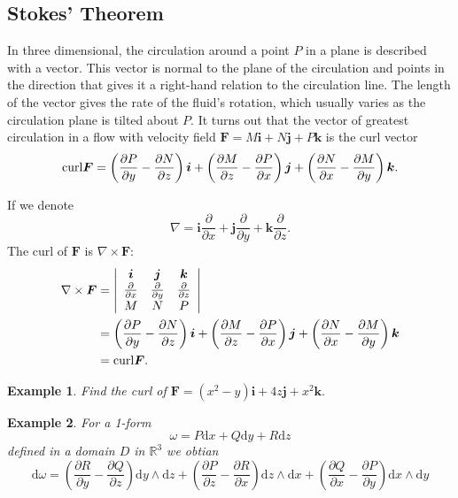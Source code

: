 \documentclass[a4paper,12pt]{article}
\newtheorem{example}{Example}             %
\begin{document}
\begin{CJK}{UTF8}{gbsn}
\section{Stokes' Theorem}
In three dimensional, the circulation around a point $P$ in a plane is 
described with a vector. This vector is normal to the plane of the 
circulation and points in the direction that gives it a right-hand 
relation to the circulation line. The length of the vector gives the
rate of the fluid's rotation, which usually varies as the circulation 
plane is tilted about $P$. It turns out that the vector of greatest circulation 
in a flow with velocity field $\bm{F} = M\bm{i} + N\bm{j} + P\bm{k}$
is the curl vector
\begin{equation}
    {\rm curl}\bm{F} = \left(\frac{\partial P}{\partial y} - \frac{\partial N}{\partial z}\right)
    \bm{i} + \left(\frac{\partial M}{\partial z} - \frac{\partial P}{\partial x}\right)\bm{j}
    + \left(\frac{\partial N}{\partial x} - \frac{\partial M}{\partial y}\right)\bm{k}.
\end{equation}

If we denote 
\begin{equation}
    \nabla = \bm{i}\frac{\partial}{\partial x} + \bm{j}\frac{\partial}{\partial y} + \bm{k}\frac{\partial}{\partial z}.
\end{equation}
The curl of $\bm{F}$ is $\nabla \times \bm{F}$:
\[
    \begin{split}
        \nabla \times \bm{F} & = \left| \begin{array}{ccc} \bm{i} & \bm{j} & \bm{k} \\
        \frac{\partial}{\partial x} & \frac{\partial}{\partial y} & \frac{\partial}{\partial z}\\
    M & N & P \end{array} \right|\\
        & = \left(\frac{\partial P}{\partial y} - \frac{\partial N}{\partial z}\right)
    \bm{i} + \left(\frac{\partial M}{\partial z} - \frac{\partial P}{\partial x}\right)\bm{j}
    + \left(\frac{\partial N}{\partial x} - \frac{\partial M}{\partial y}\right)\bm{k}\\
        & = {\rm curl }\bm{F}.
    \end{split}
\]

\begin{example}
    Find the curl of $\bm{F} = \left(x^2 - y\right)\bm{i} + 4z\bm{j} + x^2\bm{k}.$
\end{example}

\begin{example}
    For a 1-form 
    \[
        \omega = P\mathrm{d}x + Q\mathrm{d}y + R\mathrm{d}z
    \]
    defined in a domain $D$ in $\mathbb{R}^3$ we obtian
    \[
        \mathrm{d}\omega = \left(\frac{\partial R}{\partial y} 
        - \frac{\partial Q}{\partial z}\right)\mathrm{d}y \wedge \mathrm{d}z
        +\left(\frac{\partial P}{\partial z} - \frac{\partial R}{\partial x}\right)
        \mathrm{d}z \wedge \mathrm{d}x 
        + \left(\frac{\partial Q}{\partial x} - \frac{\partial P}{\partial y}\right)\mathrm{d}x \wedge \mathrm{d}y
    \]
\end{example}


\end{CJK}
\end{document}
